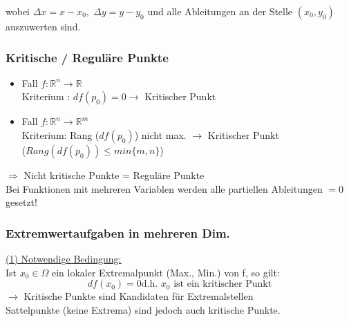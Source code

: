 \documentclass[6pt]{article}
\begin{document}
\begin{multicols*}{3}
\begin{tabular}{ll}
	\end{tabular}

	wobei  $\Delta x = x - x_0, \;\Delta y = y - y_0$ und alle Ableitungen an der Stelle $(x_0, y_0)$ auszuwerten sind.
	 
	 \vspace{10mm}
	 \quad
	
	\pagebreak
	\subsubsection*{Kritische / Regul{\"a}re Punkte}
	\begin{itemize}[itemsep=3pt, parsep=2pt, leftmargin=*,align=left]
		\item Fall $f: \mathbb{R}^n \to \mathbb{R} $   \\
				Kriterium : $df(p_0)=0 \rightarrow$ Kritischer Punkt	
					                                                                                                                                                                                                                      
		\item Fall $f: \mathbb{R}^n \to \mathbb{R}^m $ \\
			Kriterium: Rang ($df(p_0)$) nicht max. $\rightarrow$ Kritischer Punkt\\
			 ($Rang(df(p_0)) \leq min\{m,n\}$)
	\end{itemize}
	
	$\Rightarrow $ Nicht kritische Punkte = Regul{\"a}re Punkte \\
	
	Bei Funktionen mit mehreren Variablen werden alle partiellen Ableitungen $= 0$ gesetzt!
	
	\subsubsection*{Extremwertaufgaben in mehreren Dim.}
	\underline{(1) Notwendige Bedingung:} \vspace{1mm}\\
	Ist $x_0 \in \Omega$ ein lokaler Extremalpunkt (Max., Min.) von f, so gilt: \\
	\[
		df(x_0)=0 \text{d.h. $x_0$ ist ein kritischer Punkt}
	\]
	$\rightarrow$ Kritische Punkte sind Kandidaten f{\"u}r Extremalstellen\\
	 Sattelpunkte (keine Extrema) sind jedoch auch kritische Punkte.
	

\end{multicols*}
\end{document}
